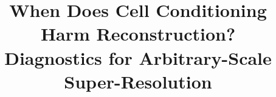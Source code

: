 \documentclass{article}
\title{When Does Cell Conditioning Harm Reconstruction?\\
Diagnostics for Arbitrary-Scale Super-Resolution}
\begin{document}
\maketitle

\clearpage
\balance


\end{document}
